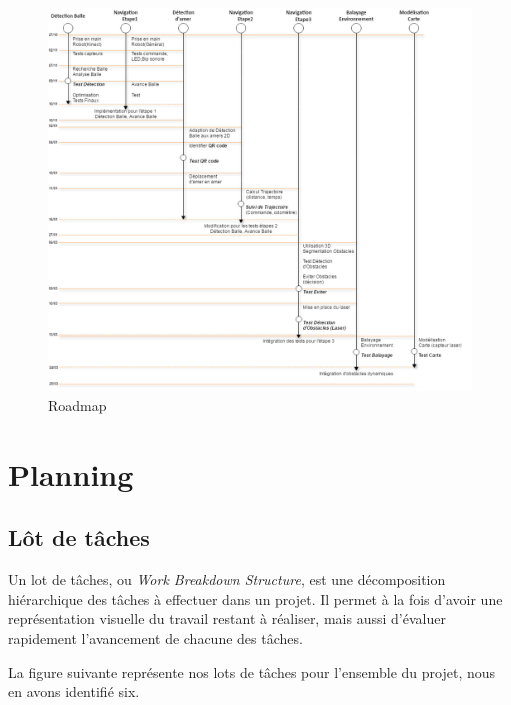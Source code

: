 \documentclass[10pt,a4paper]{article}
\begin{document}
\begin{figure}
  \centering
\noindent\includegraphics[width=\textwidth]{roadmap.png} 
  \caption{Roadmap}
\end{figure}

\section{Planning}
\label{sec:planning}

\subsection{Lôt de tâches}

Un lot de tâches, ou \textit{Work Breakdown Structure}, est une décomposition hiérarchique des tâches à effectuer dans un projet. Il permet à la fois d'avoir une représentation visuelle du travail restant à réaliser, mais aussi d'évaluer rapidement l'avancement de chacune des tâches.

La figure suivante représente nos lots de tâches pour l'ensemble du projet, nous en avons identifié six.
\end{document}
